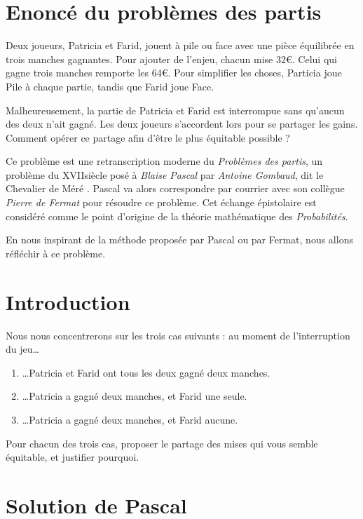 \documentclass{article}
\begin{document}
\section{Enoncé du problèmes des partis}
\begin{tcolorbox}
Deux joueurs, Patricia et Farid, jouent à pile ou face avec une pièce équilibrée en trois manches gagnantes. Pour ajouter de l'enjeu, chacun mise $32 €$. Celui qui gagne trois manches remporte les $64 €$. Pour simplifier les choses, Particia joue Pile à chaque partie, tandis que Farid joue Face.  

Malheureusement, la partie de Patricia et Farid est interrompue sans qu'aucun des deux n'ait gagné. Les deux joueurs s'accordent lors pour se partager les gains. Comment opérer ce partage afin d'être le plus équitable possible ?
\end{tcolorbox}
Ce problème est une retranscription moderne du \emph{Problèmes des partis}, un problème du \textsc{XVII}\ieme siècle posé à \emph{Blaise Pascal} par \emph{Antoine Gombaud}, dit \og le Chevalier de Méré \fg. Pascal va alors correspondre par courrier avec son collègue \emph{Pierre de Fermat} pour résoudre ce problème. Cet échange épistolaire est considéré comme le point d'origine de la théorie mathématique des \emph{Probabilités}.

En nous inspirant de la méthode proposée par Pascal ou par Fermat, nous allons réfléchir à ce problème.

\section{Introduction}
Nous nous concentrerons sur les trois cas suivants : au moment de l'interruption du jeu\dots
\begin{enumerate}
\item \dots Patricia et Farid ont tous les deux gagné deux manches.\label{22}
\item \dots Patricia a gagné deux manches, et Farid une seule.\label{21}
\item \dots Patricia a gagné deux manches, et Farid aucune.\label{20}
\end{enumerate}
\begin{tcolorbox}
Pour chacun des trois cas, proposer le partage des mises qui vous semble équitable, et justifier pourquoi.
\end{tcolorbox}

\section{Solution de Pascal}
\end{document}
